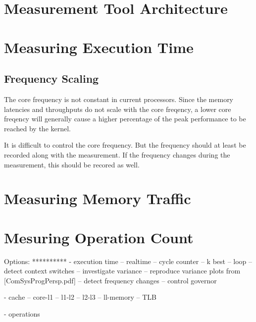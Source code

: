 \documentclass[12pt]{article}
\begin{document}
\section{Measurement Tool Architecture}

\section{Measuring Execution Time}

\subsection{Frequency Scaling}
The core frequency is not constant in current processors. Since the memory latencies and throughputs do not scale with the core freqency, a lower core freqency will generally cause a higher percentage of the peak performance to be reached by the kernel.

It is difficult to control the core frequency. But the frequency should at least be recorded along with the measurement. If the frequency changes during the measurement, this should be recored as well.

\section{Measuring Memory Traffic}


\section{Mesuring Operation Count}


Options:
**********
- execution time
-- realtime
-- cycle counter
-- k best
-- loop
-- detect context switches
-- investigate variance
-- reproduce variance plots from [ComSysProgPersp.pdf]
-- detect frequency changes
-- control governor

- cache
-- core-l1
-- l1-l2
-- l2-l3
-- ll-memory
-- TLB

- operations



\end{document}
